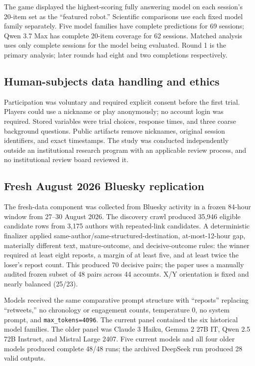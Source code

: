 \documentclass[10pt,twocolumn]{article}
\begin{document}
The game displayed the highest-scoring fully answering model on each session's 20-item set as the ``featured robot.'' Scientific comparisons use each fixed model family separately. Five model families have complete predictions for 69 sessions; Qwen 3.7 Max has complete 20-item coverage for 62 sessions. Matched analysis uses only complete sessions for the model being evaluated. Round 1 is the primary analysis; later rounds had eight and two completions respectively.

\subsection{Human-subjects data handling and ethics}
Participation was voluntary and required explicit consent before the first trial. Players could use a nickname or play anonymously; no account login was required. Stored variables were trial choices, response times, and three coarse background questions. Public artifacts remove nicknames, original session identifiers, and exact timestamps. The study was conducted independently outside an institutional research program with an applicable review process, and no institutional review board reviewed it.

\subsection{Fresh August 2026 Bluesky replication}
The fresh-data component was collected from Bluesky activity in a frozen 84-hour window from 27--30 August 2026. The discovery crawl produced 35,946 eligible candidate rows from 3,175 authors with repeated-link candidates. A deterministic finalizer applied same-author/same-structured-destination, at-most-12-hour gap, materially different text, mature-outcome, and decisive-outcome rules: the winner required at least eight reposts, a margin of at least five, and at least twice the loser's repost count. This produced 70 decisive pairs; the paper uses a manually audited frozen subset of 48 pairs across 44 accounts. X/Y orientation is fixed and nearly balanced (25/23).

Models received the same comparative prompt structure with ``reposts'' replacing ``retweets,'' no chronology or engagement counts, temperature 0, no system prompt, and \texttt{max\_tokens=4096}. The current panel contained the six historical model families. The older panel was Claude 3 Haiku, Gemma 2 27B IT, Qwen 2.5 72B Instruct, and Mistral Large 2407. Five current models and all four older models produced complete 48/48 runs; the archived DeepSeek run produced 28 valid outputs.
\end{document}
